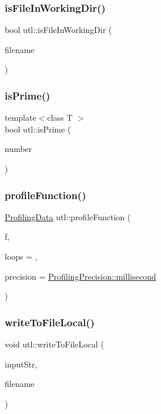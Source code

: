 \subsubsection{\texorpdfstring{is\+File\+In\+Working\+Dir()}{isFileInWorkingDir()}}
{\footnotesize\ttfamily bool utl\+::is\+File\+In\+Working\+Dir (\begin{DoxyParamCaption}\item[{const char $\ast$}]{filename }\end{DoxyParamCaption})}

\mbox{\label{namespaceutl_ad79105f1343d47a6ebfb4b246b653dae}} 
\subsubsection{\texorpdfstring{is\+Prime()}{isPrime()}}
{\footnotesize\ttfamily template$<$class T $>$ \\
bool utl\+::is\+Prime (\begin{DoxyParamCaption}\item[{T}]{number }\end{DoxyParamCaption})}

\mbox{\label{namespaceutl_a7a49e569588dd5840a41906b2b347380}} 
\subsubsection{\texorpdfstring{profile\+Function()}{profileFunction()}}
{\footnotesize\ttfamily \mbox{\hyperlink{structutl_1_1_profiling_data}{Profiling\+Data}} utl\+::profile\+Function (\begin{DoxyParamCaption}\item[{const std\+::function$<$ void()$>$ \&}]{f,  }\item[{unsigned int}]{loops = {},  }\item[{\mbox{\hyperlink{namespaceutl_ad221bb3fac593651670bdc0263b92707}{Profiling\+Precision}}}]{precision = {\ttfamily \mbox{\hyperlink{namespaceutl_ad221bb3fac593651670bdc0263b92707a407aa8403e413c457b081a9dc095a285}{Profiling\+Precision\+::millisecond}}} }\end{DoxyParamCaption})}

\mbox{\label{namespaceutl_a39cf4bd9ebce7d12a9acca32edc2ac8d}} 
\subsubsection{\texorpdfstring{write\+To\+File\+Local()}{writeToFileLocal()}}
{\footnotesize\ttfamily void utl\+::write\+To\+File\+Local (\begin{DoxyParamCaption}\item[{const std\+::string \&}]{input\+Str,  }\item[{const char $\ast$}]{filename }\end{DoxyParamCaption})}

